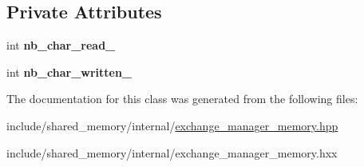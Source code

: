 \subsection*{Private Attributes}
\begin{DoxyCompactItemize}
\item 
\mbox{\label{classshared__memory_1_1internal_1_1Exchange__manager__memory_a954428f2d2e9f7b29cd4201bfb7fa51c}} 
int {\bfseries nb\+\_\+char\+\_\+read\+\_\+}
\item 
\mbox{\label{classshared__memory_1_1internal_1_1Exchange__manager__memory_a5669c5ec75442d54fd5e004a464233da}} 
int {\bfseries nb\+\_\+char\+\_\+written\+\_\+}
\end{DoxyCompactItemize}


The documentation for this class was generated from the following files\+:\begin{DoxyCompactItemize}
\item 
include/shared\+\_\+memory/internal/\hyperlink{exchange__manager__memory_8hpp}{exchange\+\_\+manager\+\_\+memory.\+hpp}\item 
include/shared\+\_\+memory/internal/exchange\+\_\+manager\+\_\+memory.\+hxx\end{DoxyCompactItemize}
